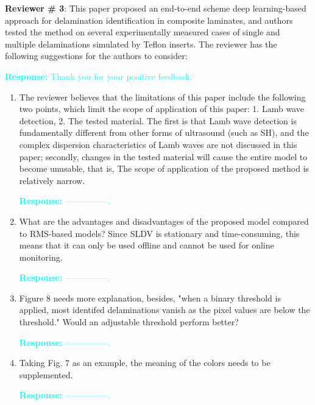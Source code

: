 \documentclass[11pt,a2paper]{report}
\begin{document}
\newpage 
\textbf{Reviewer \# 3}:
\newline This paper proposed an end-to-end scheme deep learning-based approach 
for delamination identification in composite laminates, and authors tested the 
method on several experimentally measured cases of single and multiple 
delaminations simulated by Teﬂon inserts.
The reviewer has the following suggestions for the authors to consider:

\textcolor{Cyan}{
	\newline\textbf{Response:}
	Thank you for your positive feedback.
}
\begin{enumerate}
	\item The reviewer believes that the limitations of this paper include the 
	following two points, which limit the scope of application of this paper: 
	1. Lamb wave detection, 2. The tested material. The first is that Lamb wave 
	detection is fundamentally different from other forms of ultrasound (such 
	as SH), and the complex dispersion characteristics of Lamb waves are not 
	discussed in this paper; secondly, changes in the tested material will 
	cause the entire model to become unusable, that is, The scope of 
	application of the proposed method is relatively narrow.
	
	\textcolor{Cyan}{
		\textbf{Response:}
		---------------.
	}
	
	\item What are the advantages and disadvantages of the proposed model 
	compared to RMS-based models? Since SLDV is stationary and time-consuming, 
	this means that it can only be used offline and cannot be used for online 
	monitoring.
	
	\textcolor{Cyan}{
		\textbf{Response:}
		---------------.
	}
	\item Figure 8 needs more explanation, besides, "when a binary threshold is 
	applied, most identifed delaminations vanish as the pixel values are below 
	the threshold." Would an adjustable threshold perform better?
	
	\textcolor{Cyan}{
		\textbf{Response:}
		---------------.
	}
	
	\item Taking Fig. 7 as an example, the meaning of the colors needs to be 
	supplemented.
	
	\textcolor{Cyan}{
		\textbf{Response:}
		---------------.
	}	
	
\end{enumerate}	
\end{document}
